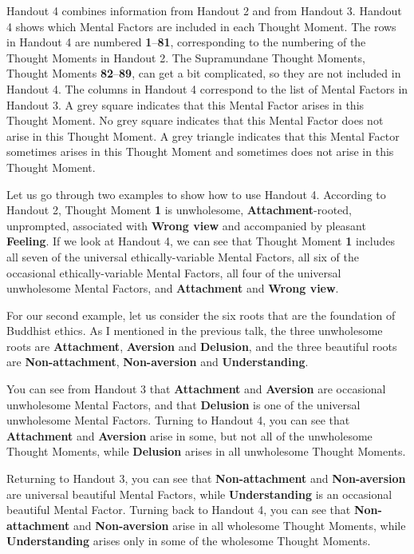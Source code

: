 Handout 4 combines information from Handout 2 and from Handout 3. Handout 4 shows which Mental Factors are included in each Thought Moment. The rows in Handout 4 are numbered \textbf{1}--\textbf{81}, corresponding to the numbering of the Thought Moments in Handout 2. The Supramundane Thought Moments, Thought Moments \textbf{82}--\textbf{89}, can get a bit complicated, so they are not included in Handout 4. The columns in Handout 4 correspond to the list of Mental Factors in Handout 3. A grey square indicates that this Mental Factor arises in this Thought Moment. No grey square indicates that this Mental Factor does not arise in this Thought Moment. A grey triangle indicates that this Mental Factor sometimes arises in this Thought Moment and sometimes does not arise in this Thought Moment.

Let us go through two examples to show how to use Handout 4. According to Handout 2, Thought Moment \textbf{1} is unwholesome, \textbf{Attachment}-rooted, unprompted, associated with \textbf{Wrong view} and accompanied by pleasant \textbf{Feeling}. If we look at Handout 4, we can see that Thought Moment \textbf{1} includes all seven of the universal ethically-variable Mental Factors, all six of the occasional ethically-variable Mental Factors, all four of the universal unwholesome Mental Factors, and \textbf{Attachment} and \textbf{Wrong view}.

For our second example, let us consider the six roots that are the foundation of Buddhist ethics. As I mentioned in the previous talk, the three unwholesome roots are \textbf{Attachment}, \textbf{Aversion} and \textbf{Delusion}, and the three beautiful roots are \textbf{Non-attachment}, \textbf{Non-aversion} and \textbf{Understanding}. 

You can see from Handout 3 that \textbf{Attachment} and \textbf{Aversion} are occasional unwholesome Mental Factors, and that \textbf{Delusion} is one of the universal unwholesome Mental Factors. Turning to Handout 4, you can see that \textbf{Attachment} and \textbf{Aversion} arise in some, but not all of the unwholesome Thought Moments, while \textbf{Delusion} arises in all unwholesome Thought Moments. 

Returning to Handout 3, you can see that \textbf{Non-attachment} and \textbf{Non-aversion} are universal beautiful Mental Factors, while \textbf{Understanding} is an occasional beautiful Mental Factor. Turning back to Handout 4, you can see that \textbf{Non-attachment} and \textbf{Non-aversion} arise in all wholesome Thought Moments, while \textbf{Understanding} arises only in some of the wholesome Thought Moments.

